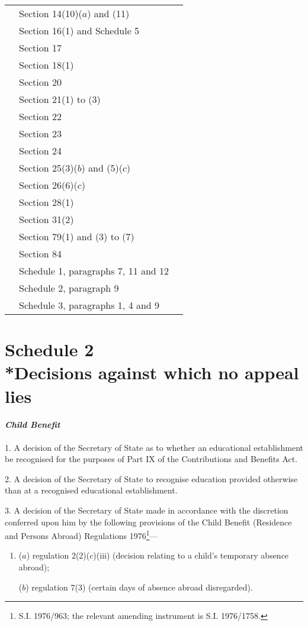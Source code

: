 \documentclass[12pt,a4paper]{article}
\begin{document}
{\begin{longtable}{p{150pt}p{102pt}p{102pt}}
&Section 14(10)($a$) and (11)\\
&Section 16(1) and Schedule 5\\
&Section 17\\
&Section 18(1)\\
&Section 20\\
&Section 21(1) to (3)\\
&Section 22\\
&Section 23\\
&Section 24\\
&Section 25(3)($b$) and (5)($c$)\\
&Section 26(6)($c$)\\
&Section 28(1)\\
&Section 31(2)\\
&Section 79(1) and (3) to (7)\\
&Section 84\\
&Schedule 1, paragraphs 7, 11 and 12\\
&Schedule 2, paragraph 9\\
&Schedule 3, paragraphs 1, 4 and 9\\
\end{longtable}

}

\part[Schedule 2 --- Decisions against which no appeal lies]{Schedule 2\\*Decisions against which no appeal lies}

\renewcommand\parthead{--- Schedule 2}

\subsection*{\itshape Child Benefit}

1.  A decision of the Secretary of State as to whether an educational establishment be recognised for the purposes of Part IX of the Contributions and Benefits Act.

\medskip

2.  A decision of the Secretary of State to recognise education provided otherwise than at a recognised educational establishment.

\medskip

3.  A decision of the Secretary of State made in accordance with the discretion conferred upon him by the following provisions of the Child Benefit (Residence and Persons Abroad) Regulations 1976\footnote{\frenchspacing S.I. 1976/963; the relevant amending instrument is S.I. 1976/1758.}—
\begin{enumerate}\item[]
($a$) regulation 2(2)($c$)(iii) (decision relating to a child’s temporary absence abroad);

($b$) regulation 7(3) (certain days of absence abroad disregarded).
\end{enumerate}
\end{document}
